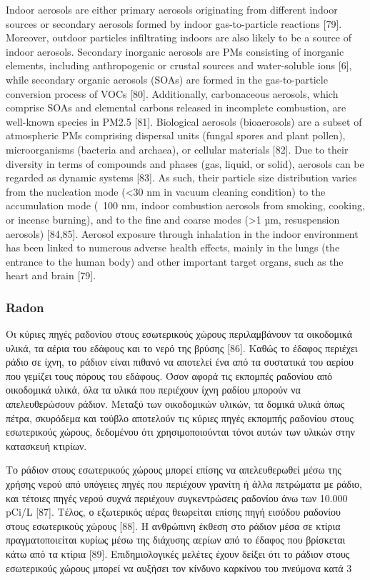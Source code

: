 Indoor aerosols are either primary aerosols originating from different indoor sources or secondary aerosols formed by indoor gas-to-particle reactions [79]. Moreover, outdoor particles infiltrating indoors are also likely to be a source of indoor aerosols. Secondary inorganic aerosols are PMs consisting of inorganic elements, including anthropogenic or crustal sources and water-soluble ions [6], while secondary organic aerosols (SOAs) are formed in the gas-to-particle conversion process of VOCs [80]. Additionally, carbonaceous aerosols, which comprise SOAs and elemental carbons released in incomplete combustion, are well-known species in PM2.5 [81]. Biological aerosols (bioaerosols) are a subset of atmospheric PMs comprising dispersal units (fungal spores and plant pollen), microorganisms (bacteria and archaea), or cellular materials [82]. Due to their diversity in terms of compounds and phases (gas, liquid, or solid), aerosols can be regarded as dynamic systems [83]. As such, their particle size distribution varies from the nucleation mode (<30 nm in vacuum cleaning condition) to the accumulation mode (~100 nm, indoor combustion aerosols from smoking, cooking, or incense burning), and to the fine and coarse modes (>1 µm, resuspension aerosols) [84,85]. Aerosol exposure through inhalation in the indoor environment has been linked to numerous adverse health effects, mainly in the lungs (the entrance to the human body) and other important target organs, such as the heart and brain [79].


\cite{ijerph17238972}



\subsubsection{Radon}

Οι κύριες πηγές ραδονίου στους εσωτερικούς χώρους περιλαμβάνουν τα οικοδομικά υλικά, τα αέρια του εδάφους και το νερό της βρύσης [86]. Καθώς το έδαφος περιέχει ράδιο σε ίχνη, το ράδιον είναι πιθανό να αποτελεί ένα από τα συστατικά του αερίου που γεμίζει τους πόρους του εδάφους. Όσον αφορά τις εκπομπές ραδονίου από οικοδομικά υλικά, όλα τα υλικά που περιέχουν ίχνη ραδίου μπορούν να απελευθερώσουν ράδιον. Μεταξύ των οικοδομικών υλικών, τα δομικά υλικά όπως πέτρα, σκυρόδεμα και τούβλο αποτελούν τις κύριες πηγές εκπομπής ραδονίου στους εσωτερικούς χώρους, δεδομένου ότι χρησιμοποιούνται τόνοι αυτών των υλικών στην κατασκευή κτιρίων.

Το ράδιον στους εσωτερικούς χώρους μπορεί επίσης να απελευθερωθεί μέσω της χρήσης νερού από υπόγειες πηγές που περιέχουν γρανίτη ή άλλα πετρώματα με ράδιο, και τέτοιες πηγές νερού συχνά περιέχουν συγκεντρώσεις ραδονίου άνω των 10.000 pCi/L [87]. Τέλος, ο εξωτερικός αέρας θεωρείται επίσης πηγή εισόδου ραδονίου στους εσωτερικούς χώρους [88]. Η ανθρώπινη έκθεση στο ράδιον μέσα σε κτίρια πραγματοποιείται κυρίως μέσω της διάχυσης αερίων από το έδαφος που βρίσκεται κάτω από τα κτίρια [89]. Επιδημιολογικές μελέτες έχουν δείξει ότι το ράδιον στους εσωτερικούς χώρους μπορεί να αυξήσει τον κίνδυνο καρκίνου του πνεύμονα κατά 3%

